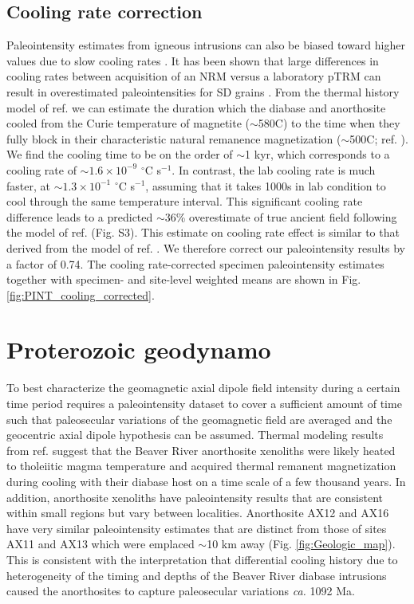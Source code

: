 \documentclass[9pt,twocolumn,twoside,lineno]{pnas-new}
\begin{document}
\subsection*{Cooling rate correction}
Paleointensity estimates from igneous intrusions can also be biased toward higher values due to slow cooling rates \cite{Halgedahl1980a}. It has been shown that large differences in cooling rates between acquisition of an NRM versus a laboratory pTRM can result in overestimated paleointensities for SD grains \cite{Dodson1980a, Halgedahl1980a, Nagy2021a}. From the thermal history model of ref. \citealp{Zhang2021b} we can estimate the duration which the diabase and anorthosite cooled from the Curie temperature of magnetite ($\sim$580\textdegree C) to the time when they fully block in their characteristic natural remanence magnetization ($\sim$500\textdegree C; ref. \citealp{Zhang2021b}). We find the cooling time to be on the order of $\sim$1 kyr, which corresponds to a cooling rate of $\sim 1.6\times10^{-9}$ $^\circ$C s$^{-1}$. In contrast, the lab cooling rate is much faster, at $\sim 1.3\times10^{-1}$ $^\circ$C s$^{-1}$, assuming that it takes 1000s in lab condition to cool through the same temperature interval. This significant cooling rate difference leads to a predicted $\sim$36\% overestimate of true ancient field following the model of ref. \citealp{Halgedahl1980a} (Fig. S3). This estimate on cooling rate effect is similar to that derived from the model of ref. \citealp{Nagy2021a}. We therefore correct our paleointensity results by a factor of 0.74. The cooling rate-corrected specimen paleointensity estimates together with specimen- and site-level weighted means are shown in Fig. \ref{fig:PINT_cooling_corrected}.

\section*{Proterozoic geodynamo}
To best characterize the geomagnetic axial dipole field intensity during a certain time period requires a paleointensity dataset to cover a sufficient amount of time such that paleosecular variations of the geomagnetic field are averaged and the geocentric axial dipole hypothesis can be assumed. Thermal modeling results from ref. \citealp{Zhang2021b} suggest that the Beaver River anorthosite xenoliths were likely heated to tholeiitic magma temperature and acquired thermal remanent magnetization during cooling with their diabase host on a time scale of a few thousand years. In addition, anorthosite xenoliths have paleointensity results that are consistent within small regions but vary between localities. Anorthosite AX12 and AX16 have very similar paleointensity estimates that are distinct from those of sites AX11 and AX13 which were emplaced $\sim$10 km away (Fig. \ref{fig:Geologic_map}). This is consistent with the interpretation that differential cooling history due to heterogeneity of the timing and depths of the Beaver River diabase intrusions caused the anorthosites to capture paleosecular variations \textit{ca.} 1092 Ma. 
\end{document}
